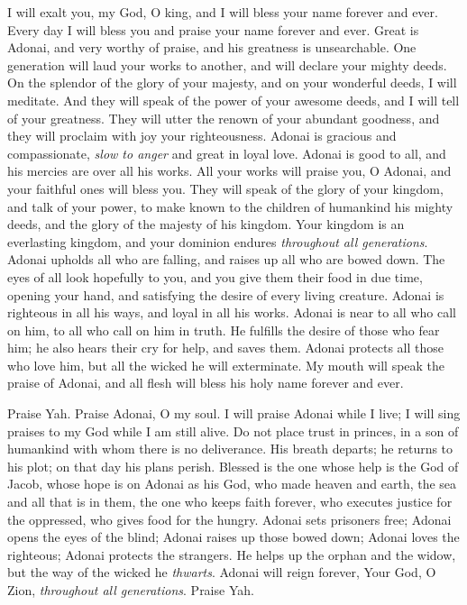\begin{biblechapter} %
 I will exalt you, my God, O king, 
and I will bless your name forever and ever.
\verse Every day I will bless you 
and praise your name forever and ever.
\verse Great is Adonai, and very worthy of praise, 
and his greatness is unsearchable.
\verse One generation will laud your works to another, 
and will declare your mighty deeds.
\verse On the splendor of the glory of your majesty, 
and on your wonderful deeds, I will meditate.
\verse And they will speak of the power of your awesome deeds, 
and I will tell of your greatness.
\verse They will utter  the renown of your abundant goodness, 
and they will proclaim with joy your righteousness.
\verse Adonai is gracious and compassionate, 
\textit{slow to anger} and great in loyal love.
\verse Adonai is good to all, 
and his mercies are over all his works.
\verse All your works will praise you, O Adonai, 
and your faithful ones will bless you.
\verse They will speak of the glory of your kingdom, 
and talk of your power,
\verse to make known to the children of humankind his mighty deeds, 
and the glory of the majesty of his kingdom.
\verse Your kingdom is an everlasting kingdom, 
and your dominion endures \textit{throughout all generations}.
\verse Adonai upholds all who are falling, 
and raises up all who are bowed down.
\verse The eyes of all look hopefully to you, 
and you give them their food in due time,
\verse opening your hand, 
and satisfying the desire of every living creature.
\verse Adonai is righteous in all his ways, 
and loyal in all his works.
\verse Adonai is near to all who call on him, 
to all who call on him in truth.
\verse He fulfills the desire of those who fear him; 
he also hears their cry for help, and saves them.
\verse Adonai protects all those who love him, 
but all the wicked he will exterminate.
\verse My mouth will speak the praise of Adonai, 
and all flesh will bless his holy name 
forever and ever.
\end{biblechapter}

\begin{biblechapter} %
 Praise Yah. 
Praise Adonai, O my soul.
\verse I will praise Adonai while I live; 
I will sing praises to my God while I am still alive.
\verse Do not place trust in princes, 
in a son of humankind with whom there is no deliverance.
\verse His breath departs; he returns to his plot; 
on that day his plans perish.
\verse Blessed is the one whose help is the God of Jacob, 
whose hope is on Adonai as his God,
\verse who made heaven and earth, 
the sea and all that is in them, 
the one who keeps faith forever,
\verse who executes justice for the oppressed, 
who gives food for the hungry. 
Adonai sets prisoners free;
\verse Adonai opens the eyes of the blind; 
Adonai raises up those bowed down; 
Adonai loves the righteous;
\verse Adonai protects the strangers. 
He helps up the orphan and the widow, 
but the way of the wicked he \textit{thwarts}.
\verse Adonai will reign forever, 
Your God, O Zion, \textit{throughout all generations}. 
Praise Yah.
\end{biblechapter}

